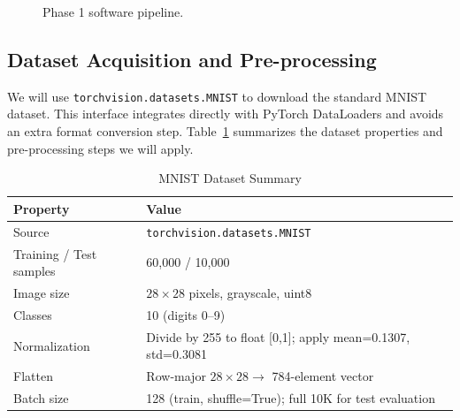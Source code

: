\documentclass[12pt, letterpaper]{article}
\begin{document}
\begin{figure}[H]
\caption{Phase 1 software pipeline.}
\label{fig:pipeline}
\end{figure}

\subsection{Dataset Acquisition and Pre-processing}
We will use \texttt{torchvision.datasets.MNIST} to download the standard MNIST dataset. This interface
integrates directly with PyTorch DataLoaders and avoids an extra format conversion step. Table~\ref{tab:mnist}
summarizes the dataset properties and pre-processing steps we will apply.

\begin{table}[H]
\centering
\caption{MNIST Dataset Summary}
\label{tab:mnist}
\begin{tabular}{ll}
\toprule
\textbf{Property} & \textbf{Value} \\
\midrule
Source                   & \texttt{torchvision.datasets.MNIST} \\
Training / Test samples  & 60,000 / 10,000 \\
Image size               & $28 \times 28$ pixels, grayscale, uint8 \\
Classes                  & 10 (digits 0--9) \\
Normalization            & Divide by 255 to float [0,1]; apply mean=0.1307, std=0.3081 \\
Flatten                  & Row-major $28\times28 \to$ 784-element vector \\
Batch size               & 128 (train, shuffle=True); full 10K for test evaluation \\
\bottomrule
\end{tabular}
\end{table}

\end{document}

